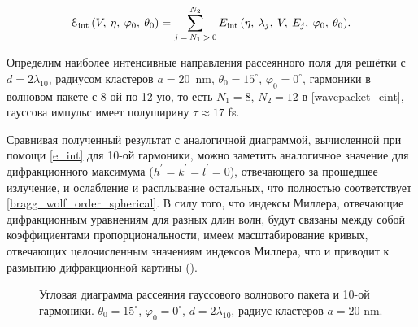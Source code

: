 
    \begin{equation}
        \EuScript{E}_{\textrm{int}} \left(V, \:\eta, \:\varphi_0, \:\theta_0 \right) = \sum\limits_{j\:=\:N_1\:>\:0}^{N_2}{E_{\textrm{int}} \left( \eta,\:\lambda_{j}, \:V, \:E_j, \:\varphi_0, \:\theta_0\right)}.
        \label{wavepacket_eint}
    \end{equation}

Определим наиболее интенсивные направления рассеянного поля для решётки с $d = 2\lambda_{10}$, радиусом кластеров $a = 20$~nm, $\theta_0 = 15^\circ$, $\varphi_0 = 0^\circ$, гармоники в волновом пакете с 8-ой по 12-ую, то есть $N_1 = 8$, $N_2 = 12$ в \autoref{wavepacket_eint}, гауссова импульс имеет полуширину $\tau \approx 17$ fs. 

Сравнивая полученный результат с аналогичной диаграммой, вычисленной при помощи \autoref{e_int} для 10-ой гармоники, можно заметить аналогичное значение для дифракционного максимума ($h^\prime = k^\prime = l^\prime = 0$), отвечающего за прошедшее излучение, и ослабление и расплывание остальных, что полностью соответствует \autoref{bragg_wolf_order_spherical}. В силу того, что индексы Миллера, отвечающие дифракционным уравнениям для разных длин волн, будут связаны между собой коэффициентами пропорциональности, имеем масштабирование кривых, отвечающих целочисленным значениям индексов Миллера, что и приводит к размытию дифракционной картины ().

    \begin{figure}[ht]
        \hfil
        \caption{Угловая диаграмма рассеяния гауссового волнового пакета и 10-ой гармоники. $\theta_0 = 15^\circ$, $\varphi_0 = 0^\circ$, $d = 2\lambda_{10}$, радиус кластеров $a = 20$ nm.}\label{wavepacket1:image}
    \end{figure}